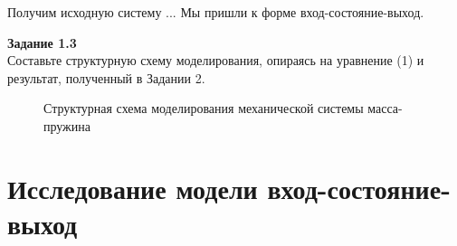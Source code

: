 \documentclass[a4paper, 12pt]{article}
\begin{document}
Получим исходную систему
...
Мы пришли к форме вход-состояние-выход.

\textbf{Задание 1.3 } \\
Составьте структурную схему моделирования, опираясь на уравнение (1) и результат, полученный в Задании 2.



\begin{figure}[h!]
	\centering
	\caption{Структурная схема моделирования механической системы масса-пружина }
	\label{p:График1_1}
\end{figure}

\newpage
\section{Исследование модели вход-состояние-выход}
\end{document}
